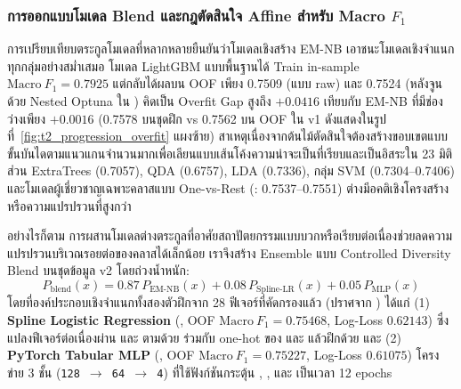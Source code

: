 \subsubsection{การออกแบบโมเดล Blend และกฎตัดสินใจ Affine สำหรับ Macro $F_1$}
\label{subsubsec:t2_blend_affine}

การเปรียบเทียบตระกูลโมเดลที่หลากหลายยืนยันว่าโมเดลเชิงสร้าง EM-NB เอาชนะโมเดลเชิงจำแนกทุกกลุ่มอย่างสม่ำเสมอ โมเดล LightGBM แบบพื้นฐานได้ Train in-sample $\mathrm{Macro}\ F_1 = 0.7925$ แต่กลับได้ผลบน OOF เพียง 0.7509 (แบบ raw) และ 0.7524 (หลังจูนด้วย Nested Optuna ใน ) คิดเป็น Overfit Gap สูงถึง $+0.0416$ เทียบกับ EM-NB ที่มีช่องว่างเพียง $+0.0016$ (0.7578 บนชุดฝึก vs 0.7562 บน OOF ใน v1 ดังแสดงในรูปที่~\ref{fig:t2_progression_overfit} แผงซ้าย) สาเหตุเนื่องจากต้นไม้ตัดสินใจต้องสร้างขอบเขตแบบขั้นบันไดตามแนวแกนจำนวนมากเพื่อเลียนแบบเส้นโค้งความน่าจะเป็นที่เรียบและเป็นอิสระใน 23 มิติ ส่วน ExtraTrees (0.7057), QDA (0.6757), LDA (0.7336), กลุ่ม SVM (0.7304--0.7406) และโมเดลผู้เชี่ยวชาญเฉพาะคลาสแบบ One-vs-Rest (: 0.7537--0.7551) ต่างมีอคติเชิงโครงสร้างหรือความแปรปรวนที่สูงกว่า

อย่างไรก็ตาม การผสานโมเดลต่างตระกูลที่อาศัยสถาปัตยกรรมแบบบวกหรือเรียบต่อเนื่องช่วยลดความแปรปรวนบริเวณรอยต่อของคลาสได้เล็กน้อย เราจึงสร้าง Ensemble แบบ Controlled Diversity Blend บนชุดข้อมูล v2 โดยถ่วงน้ำหนัก:
\begin{equation}
\label{eq:t2_blend}
P_{\mathrm{blend}}(x) = 0.87\,P_{\mathrm{EM\text{-}NB}}(x) + 0.08\,P_{\mathrm{Spline\text{-}LR}}(x) + 0.05\,P_{\mathrm{MLP}}(x)
\end{equation}
โดยที่องค์ประกอบเชิงจำแนกทั้งสองตัวฝึกจาก 28 ฟีเจอร์ที่คัดกรองแล้ว (ปราศจาก ) ได้แก่ (1) \textbf{Spline Logistic Regression} (, OOF $\mathrm{Macro}\ F_1 = 0.75468$, Log-Loss $0.62143$) ซึ่งแปลงฟีเจอร์ต่อเนื่องผ่าน  และ  ตามด้วย  ร่วมกับ one-hot ของ  และ  แล้วฝึกด้วย  และ (2) \textbf{PyTorch Tabular MLP} (, OOF $\mathrm{Macro}\ F_1 = 0.75227$, Log-Loss $0.61075$) โครงข่าย 3 ชั้น (\texttt{128 $\to$ 64 $\to$ 4}) ที่ใช้ฟังก์ชันกระตุ้น , ,  และ  เป็นเวลา 12 epochs

